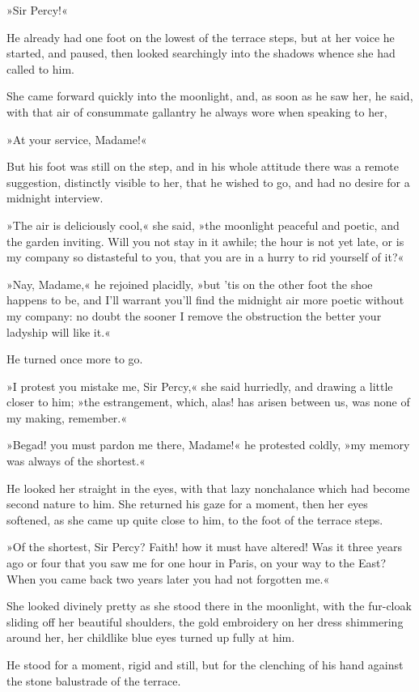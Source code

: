 »Sir Percy!«

He already had one foot on the lowest of the terrace steps, but at her voice he started, and paused, then looked searchingly into the shadows whence she had called to him.

She came forward quickly into the moonlight, and, as soon as he saw her, he said, with that air of consummate gallantry he always wore when speaking to her,\longdash


»At your service, Madame!«

But his foot was still on the step, and in his whole attitude there was a remote suggestion, distinctly visible to her, that he wished to go, and had no desire for a midnight interview.

»The air is deliciously cool,« she said, »the moonlight peaceful and poetic, and the garden inviting. Will you not stay in it awhile; the hour is not yet late, or is my company so distasteful to you, that you are in a hurry to rid yourself of it?«

»Nay, Madame,« he rejoined placidly, »but 'tis on the other foot the shoe happens to be, and I'll warrant you'll find the midnight air more poetic without my company: no doubt the sooner I remove the obstruction the better your ladyship will like it.«

He turned once more to go.

»I protest you mistake me, Sir Percy,« she said hurriedly, and drawing a little closer to him; »the estrangement, which, alas! has arisen between us, was none of my making, remember.«

»Begad! you must pardon me there, Madame!« he protested coldly, »my memory was always of the shortest.«

He looked her straight in the eyes, with that lazy nonchalance which had become second nature to him. She returned his gaze for a moment, then her eyes softened, as she came up quite close to him, to the foot of the terrace steps.

»Of the shortest, Sir Percy? Faith! how it must have altered! Was it three years ago or four that you saw me for one hour in Paris, on your way to the East? When you came back two years later you had not forgotten me.«

She looked divinely pretty as she stood there in the moonlight, with the fur-cloak sliding off her beautiful shoulders, the gold embroidery on her dress shimmering around her, her childlike blue eyes turned up fully at him.

He stood for a moment, rigid and still, but for the clenching of his hand against the stone balustrade of the terrace.

